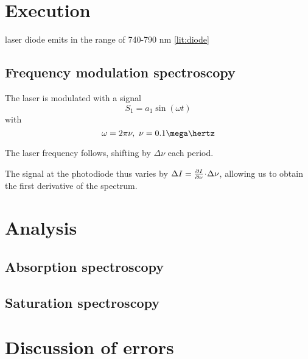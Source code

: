 
\section{Execution} %

laser diode emits in the range of 740-790 nm \ref{lit:diode}

\subsection{Frequency modulation spectroscopy}
The laser is modulated with a signal
\begin{equation}
 S_1 = a_1 \sin(\omega t)
\end{equation}
with
\begin{equation}
 \omega = 2 \pi \nu,~ \nu = 0.1 \mega\hertz
\end{equation}

The laser frequency follows, shifting by $\Delta \nu$ each period.

The signal at the photodiode thus varies by $\Delta I = \frac{\partial I}{\partial\nu} \!\cdot\! \Delta \nu$, allowing us to obtain the first derivative of the spectrum.


\section{Analysis}
\subsection{Absorption spectroscopy}

\subsection{Saturation spectroscopy}












\section{Discussion of errors}

